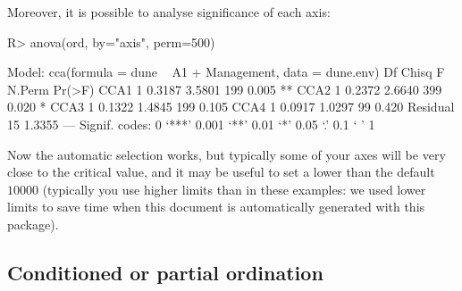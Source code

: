 \documentclass[article,nojss]{jss}
\begin{document}
Moreover, it is possible to analyse significance of each axis:
\begin{Schunk}
\begin{Sinput}
R> anova(ord, by="axis", perm=500)
\end{Sinput}
\begin{Soutput}
Model: cca(formula = dune ~ A1 + Management, data = dune.env)
         Df  Chisq      F N.Perm Pr(>F)   
CCA1      1 0.3187 3.5801    199  0.005 **
CCA2      1 0.2372 2.6640    399  0.020 * 
CCA3      1 0.1322 1.4845    199  0.105   
CCA4      1 0.0917 1.0297     99  0.420   
Residual 15 1.3355                        
---
Signif. codes:  0 ‘***’ 0.001 ‘**’ 0.01 ‘*’ 0.05 ‘.’ 0.1 ‘ ’ 1 
\end{Soutput}
\end{Schunk}
Now the automatic selection works, but typically some of your axes
will be very close to the critical value, and it may be useful to set
a lower  than the default $10000$ (typically you use
higher limits than in these examples: we used lower limits to save
time when this document is automatically generated with this package).

\subsection{Conditioned or partial ordination}
\end{document}
